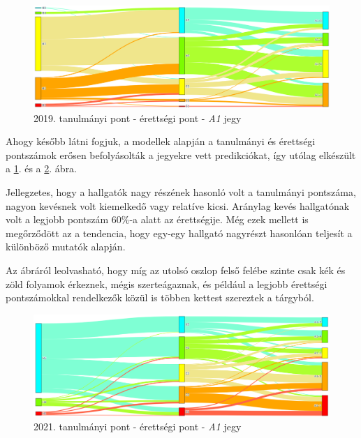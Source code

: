 \documentclass[12pt]{article}
\begin{document}
\begin{figure}[H]
\centering
\includegraphics[width = \textwidth]{kepek/2019_hozott_erett_A1.png}
\caption{2019. tanulmányi pont - érettségi pont - \textit{A1} jegy}
\label{fig:2019_hozott_erett_A1}
\end{figure}
Ahogy később látni fogjuk, a modellek alapján a tanulmányi és érettségi pontszámok erősen befolyásolták a jegyekre vett predikciókat, így utólag elkészült a \ref{fig:2019_hozott_erett_A1}. és a \ref{fig:2021_hozott_erett_A1}. ábra.

Jellegzetes, hogy a hallgatók nagy részének hasonló volt a tanulmányi pontszáma, nagyon kevésnek volt kiemelkedő vagy relatíve kicsi. Aránylag kevés hallgatónak volt a legjobb pontszám 60\%-a alatt az érettségije. Még ezek mellett is megőrződött az a tendencia, hogy egy-egy hallgató nagyrészt hasonlóan teljesít a különböző mutatók alapján.

Az ábráról leolvasható, hogy míg az utolsó oszlop felső felébe szinte csak kék és zöld folyamok érkeznek, mégis szerteágaznak, és például a legjobb érettségi pontszámokkal rendelkezők közül is többen kettest szereztek a tárgyból. 

\begin{figure}[H]
\centering
\includegraphics[width = \textwidth]{kepek/2021_hozott_erett_A1.png}
\caption{2021. tanulmányi pont - érettségi pont - \textit{A1} jegy}
\label{fig:2021_hozott_erett_A1}
\end{figure}
\end{document}
